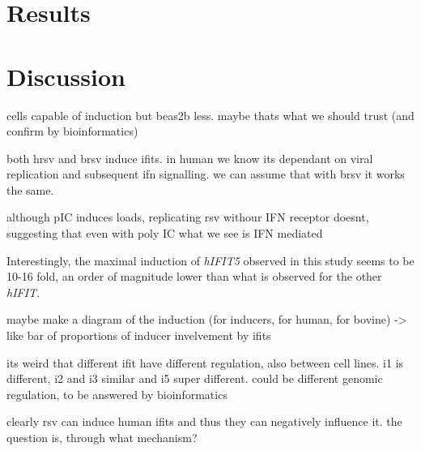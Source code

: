 \section{Results} \label{sec:Results-Chapter 1}



\section{Discussion} \label{sec:Discussion Chapter 1}


cells capable of induction but beas2b less. maybe thats what we should trust (and confirm by bioinformatics)

both hrsv and brsv induce ifits. in human we know its dependant on viral replication and subsequent ifn signalling. we can assume that with brsv it works the same.

although pIC induces loads, replicating rsv withour IFN receptor doesnt, suggesting that even with poly IC what we see is IFN mediated

Interestingly, the maximal induction of \textit{hIFIT5} observed in this study seems to be 10-16 fold, an order of magnitude lower than what is observed for the other \textit{hIFIT}.


maybe make a diagram of the induction (for inducers, for human, for bovine) -> like bar of proportions of inducer invelvement by ifits

its weird that different ifit have different regulation, also between cell lines. i1 is different, i2 and i3 similar and i5 super different. could be different genomic regulation, to be answered by bioinformatics

clearly rsv can induce human ifits and thus they can negatively influence it. the question is, through what mechanism? 



